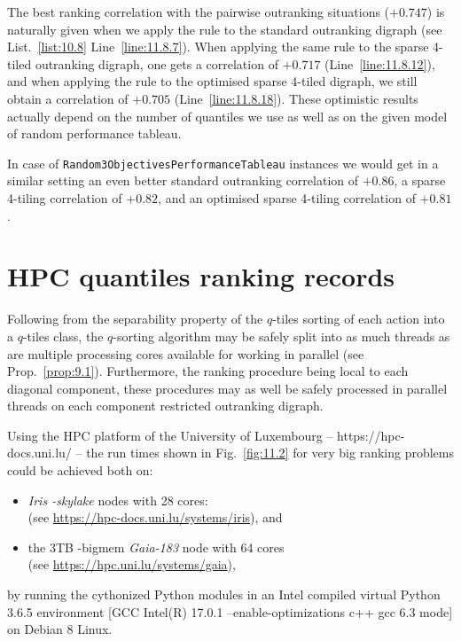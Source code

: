 The best ranking correlation with the pairwise outranking situations ($+0.747$) is naturally given when we apply the \Copeland rule to the standard outranking digraph (see List.~\vref{list:10.8} Line~\ref{line:11.8.7}). When applying the same rule to the sparse 4-tiled outranking digraph, one gets a correlation of $+0.717$ (Line~\ref{line:11.8.12}), and when applying the \Copeland rule to the optimised sparse 4-tiled digraph, we still obtain a correlation of $+0.705$ (Line~\ref{line:11.8.18}). These optimistic results actually depend on the number of quantiles we use as well as on the given model of random performance tableau.

In case of \texttt{Random3ObjectivesPerformanceTableau} instances we would get in a similar setting an even better standard outranking correlation of $+0.86$, a sparse 4-tiling correlation of $+0.82$, and an optimised sparse 4-tiling correlation of $+0.81$.

\section{HPC quantiles ranking records}
\label{sec:11.6}

Following from the separability property of the $q$-tiles sorting of each action into a $q$-tiles class, the $q$-sorting algorithm may be safely split into as much threads as are multiple processing cores available for working in parallel (see Prop.~\ref{prop:9.1}). Furthermore, the ranking procedure being local to each diagonal component, these procedures may as well be safely processed in parallel threads on each component restricted outranking digraph.

Using the HPC platform of the University of Luxembourg -- https://hpc-docs.uni.lu/ \citep{UNI-2014}-- the run times shown in Fig.~\vref{fig:11.2} for very big ranking problems could be achieved both on:
\begin{itemize}[topsep=2pt]
\item \emph{Iris -skylake} nodes with 28 cores:\\
  (see \href{https://hpc-docs.uni.lu/systems/iris/}{https://hpc-docs.uni.lu/systems/iris}), and
\item the 3TB -bigmem \emph{Gaia-183} node with 64 cores \\
  (see \href{https://hpc.uni.lu/systems/gaia/}{https://hpc.uni.lu/systems/gaia}),
\end{itemize}
by running the cythonized Python modules in an Intel compiled virtual Python 3.6.5 environment [GCC Intel(R) 17.0.1 –enable-optimizations c++ gcc 6.3 mode] on Debian 8 Linux.

